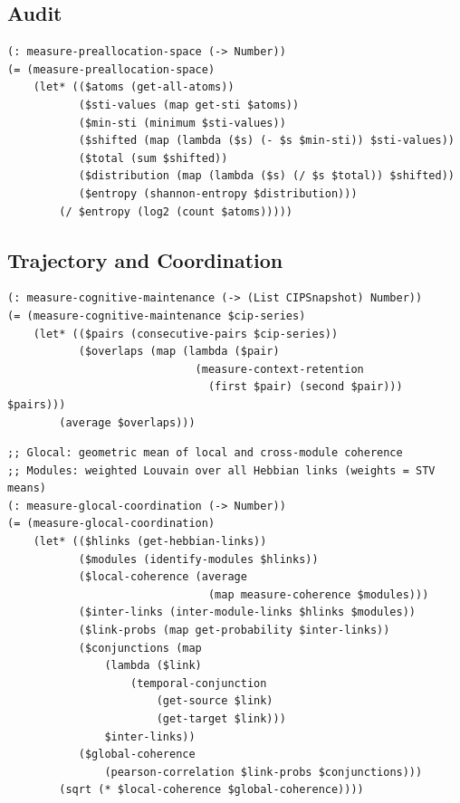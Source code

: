 \documentclass[11pt]{article}
\theoremstyle{definition}
\begin{document}
\subsection{Audit}

\begin{lstlisting}[style=metta, caption=Audit]
(: measure-preallocation-space (-> Number))
(= (measure-preallocation-space)
    (let* (($atoms (get-all-atoms))
           ($sti-values (map get-sti $atoms))
           ($min-sti (minimum $sti-values))
           ($shifted (map (lambda ($s) (- $s $min-sti)) $sti-values))
           ($total (sum $shifted))
           ($distribution (map (lambda ($s) (/ $s $total)) $shifted))
           ($entropy (shannon-entropy $distribution)))
        (/ $entropy (log2 (count $atoms)))))
\end{lstlisting}

\subsection{Trajectory and Coordination}

\begin{lstlisting}[style=metta, caption=Trajectory]
(: measure-cognitive-maintenance (-> (List CIPSnapshot) Number))
(= (measure-cognitive-maintenance $cip-series)
    (let* (($pairs (consecutive-pairs $cip-series))
           ($overlaps (map (lambda ($pair)
                             (measure-context-retention
                               (first $pair) (second $pair))) $pairs)))
        (average $overlaps)))
\end{lstlisting}

\begin{lstlisting}[style=metta, caption=Coordination]
;; Glocal: geometric mean of local and cross-module coherence
;; Modules: weighted Louvain over all Hebbian links (weights = STV means)
(: measure-glocal-coordination (-> Number))
(= (measure-glocal-coordination)
    (let* (($hlinks (get-hebbian-links))
           ($modules (identify-modules $hlinks))
           ($local-coherence (average
                               (map measure-coherence $modules)))
           ($inter-links (inter-module-links $hlinks $modules))
           ($link-probs (map get-probability $inter-links))
           ($conjunctions (map
               (lambda ($link)
                   (temporal-conjunction
                       (get-source $link)
                       (get-target $link)))
               $inter-links))
           ($global-coherence
               (pearson-correlation $link-probs $conjunctions)))
        (sqrt (* $local-coherence $global-coherence))))
\end{lstlisting}
\end{document}

